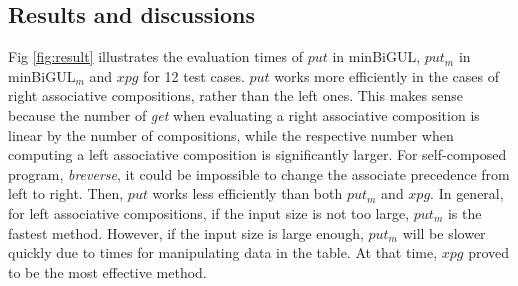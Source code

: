 \subsection{Results and discussions}



Fig \ref{fig:result} illustrates the evaluation times of $put$ in minBiGUL, $put_m$ in minBiGUL$_m$ and $xpg$ for 12 test cases. $put$ works more efficiently in the cases of right associative compositions, rather than the left ones. This makes sense because the number of \textit{get} when evaluating a right associative composition is linear by the number of compositions, while the respective number when computing a left associative composition is significantly larger. For self-composed program, \textit{breverse}, it could be impossible to change the associate precedence from left to right. Then, $put$ works less efficiently than both $put_m$ and $xpg$. In general, for left associative compositions, if the input size is not too large, $put_m$ is the fastest method. However, if the input size is large enough, $put_m$ will be slower quickly due to times for manipulating data in the table. At that time, $xpg$ proved to be the most effective method.

